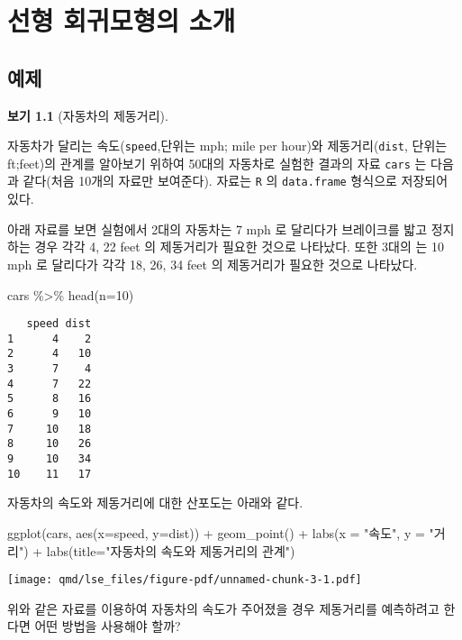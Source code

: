 \documentclass[
  11pt,
  a4paper,
  oneside]{scrbook}
\newenvironment{Shaded}{\begin{snugshade}}{\end{snugshade}}
\newcommand{\AttributeTok}[1]{\textcolor[rgb]{0.40,0.45,0.13}{#1}}
\newcommand{\DecValTok}[1]{\textcolor[rgb]{0.68,0.00,0.00}{#1}}
\newcommand{\FunctionTok}[1]{\textcolor[rgb]{0.28,0.35,0.67}{#1}}
\newcommand{\NormalTok}[1]{\textcolor[rgb]{0.00,0.23,0.31}{#1}}
\newcommand{\SpecialCharTok}[1]{\textcolor[rgb]{0.37,0.37,0.37}{#1}}
\newcommand{\StringTok}[1]{\textcolor[rgb]{0.13,0.47,0.30}{#1}}
\theoremstyle{definition}
\theoremstyle{plain}
\theoremstyle{definition}
\theoremstyle{definition}
\newtheorem{example}{보기}[chapter]
\theoremstyle{remark}
\begin{document}

\chapter{선형 회귀모형의 소개}\label{sec-simple}

\section{예제}\label{uxc608uxc81c}

\begin{example}[자동차의
제동거리]\protect\hypertarget{exm-lse-simple-1}{}\label{exm-lse-simple-1}

자동차가 달리는 속도(\texttt{speed},단위는 mph; mile per hour)와
제동거리(\texttt{dist}, 단위는 ft;feet)의 관계를 알아보기 위하여 50대의
자동차로 실험한 결과의 자료 \texttt{cars} 는 다음과 같다(처음 10개의
자료만 보여준다). 자료는 \texttt{R} 의 \texttt{data.frame} 형식으로
저장되어 있다.

아래 자료를 보면 실험에서 2대의 자동차는 7 mph 로 달리다가 브레이크를
밟고 정지하는 경우 각각 4, 22 feet 의 제동거리가 필요한 것으로 나타났다.
또한 3대의 는 10 mph 로 달리다가 각각 18, 26, 34 feet 의 제동거리가
필요한 것으로 나타났다.

\begin{Shaded}
\begin{Highlighting}[]
\NormalTok{cars }\SpecialCharTok{\%\textgreater{}\%} \FunctionTok{head}\NormalTok{(}\AttributeTok{n=}\DecValTok{10}\NormalTok{) }
\end{Highlighting}
\end{Shaded}

\begin{verbatim}
   speed dist
1      4    2
2      4   10
3      7    4
4      7   22
5      8   16
6      9   10
7     10   18
8     10   26
9     10   34
10    11   17
\end{verbatim}

자동차의 속도와 제동거리에 대한 산포도는 아래와 같다.

\begin{Shaded}
\begin{Highlighting}[]
\FunctionTok{ggplot}\NormalTok{(cars, }\FunctionTok{aes}\NormalTok{(}\AttributeTok{x=}\NormalTok{speed, }\AttributeTok{y=}\NormalTok{dist)) }\SpecialCharTok{+} \FunctionTok{geom\_point}\NormalTok{() }\SpecialCharTok{+} \FunctionTok{labs}\NormalTok{(}\AttributeTok{x =} \StringTok{"속도"}\NormalTok{, }\AttributeTok{y =} \StringTok{"거리"}\NormalTok{) }\SpecialCharTok{+}
  \FunctionTok{labs}\NormalTok{(}\AttributeTok{title=}\StringTok{"자동차의 속도와 제동거리의 관계"}\NormalTok{)}
\end{Highlighting}
\end{Shaded}

\texttt{[image: qmd/lse\_files/figure-pdf/unnamed-chunk-3-1.pdf]}

위와 같은 자료를 이용하여 자동차의 속도가 주어졌을 경우 제동거리를
예측하려고 한다면 어떤 방법을 사용해야 할까?

\end{example}
\end{document}
